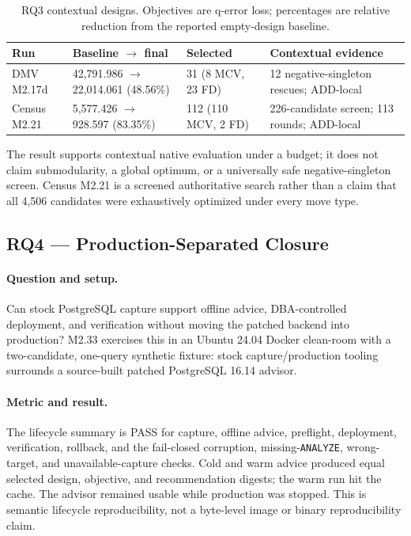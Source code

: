 \begin{table}[t]
\caption{RQ3 contextual designs. Objectives are q-error loss; percentages are
relative reduction from the reported empty-design baseline.}
\label{tab:rq3}
\scriptsize
\begin{tabular}{@{}p{}p{}p{}p{}@{}}
\toprule
Run & Baseline $\rightarrow$ final & Selected & Contextual evidence \\
\midrule
DMV M2.17d & 42,791.986 $\rightarrow$ 22,014.061 (48.56\%) & 31 (8 MCV, 23 FD) & 12 negative-singleton rescues; ADD-local \\
Census M2.21 & 5,577.426 $\rightarrow$ 928.597 (83.35\%) & 112 (110 MCV, 2 FD) & 226-candidate screen; 113 rounds; ADD-local \\
\bottomrule
\end{tabular}
\end{table}

The result supports contextual native evaluation under a budget; it does not
claim submodularity, a global optimum, or a universally safe negative-singleton
screen.  Census M2.21 is a screened authoritative search rather than a claim
that all 4,506 candidates were exhaustively optimized under every move type.

\subsection{RQ4 --- Production-Separated Closure}

\paragraph{Question and setup.}
Can stock PostgreSQL capture support offline advice, DBA-controlled deployment,
and verification without moving the patched backend into production?  M2.33
exercises this in an Ubuntu 24.04 Docker clean-room with a two-candidate,
one-query synthetic fixture: stock capture/production tooling surrounds a
source-built patched PostgreSQL 16.14 advisor.

\paragraph{Metric and result.}
The lifecycle summary is PASS for capture, offline advice, preflight,
deployment, verification, rollback, and the fail-closed corruption,
missing-\texttt{ANALYZE}, wrong-target, and unavailable-capture checks.  Cold
and warm advice produced equal selected design, objective, and recommendation
digests; the warm run hit the cache.  The advisor remained usable while
production was stopped.  This is semantic lifecycle reproducibility, not a
byte-level image or binary reproducibility claim.

